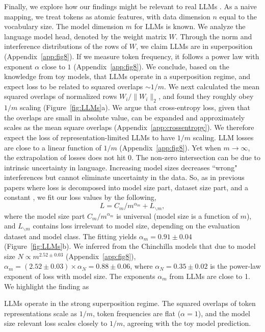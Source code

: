 \documentclass{article}
\begin{document}
Finally, we explore how our findings might be relevant to real LLMs \cite{zhang2022opt,radford2019language,qwen2.5,biderman2023pythia}. As a naive mapping, we treat tokens as atomic features, with data dimension $n$ equal to the vocabulary size. The model dimension $m$ for LLMs is known. We analyze the language model head, denoted by the weight matrix $W$. Through the norm and interference distributions of the rows of $W$, we claim LLMs are in superposition (Appendix~\ref{app:fig8}). If we measure token frequency, it follows a power law with exponent $\alpha$ close to $1$ (Appendix~\ref{app:fig8}). We conclude, based on the knowledge from toy models, that LLMs operate in a superposition regime, and expect loss to be related to squared overlaps $\sim 1/m$. We next calculated the mean squared overlaps of normalized rows $W_i/\| W_i\|_2$, and found they roughly obey $1/m$ scaling (Figure~\ref{fig:LLMs}a). We argue that cross-entropy loss, given that the overlaps are small in absolute value, can be expanded and approximately scales as the mean square overlaps (Appendix~\ref{app:crossentropy}). We therefore expect the loss of representation-limited LLMs to have $1/m$ scaling. LLM losses are close to a linear function of $1/m$ (Appendix~\ref{app:fig8}). Yet when $m\to \infty$, the extrapolation of losses does not hit $0$. The non-zero intersection can be due to intrinsic uncertainty in language. Increasing model sizes decreases ``wrong" interferences but cannot eliminate uncertainty in the data. So, as in previous papers where loss is decomposed into model size part, dataset size part, and a constant \cite{hoffmann2022chinchilla}, we fit our loss values by the following,
\begin{equation}
    L = C_m / m^{\alpha_m} + L_{\backslash m},
\end{equation}
where the model size part $C_m / m^{\alpha_m}$ is universal (model size is a function of $m$), and $L_{\backslash m}$ contains loss irrelevant to model size, depending on the evaluation dataset and model class. The fitting yields $\alpha_m = 0.91 \pm 0.04$ (Figure~\ref{fig:LLMs}b). We inferred from the Chinchilla models \cite{hoffmann2022chinchilla} that due to model size $N\propto m^{2.52\pm0.03}$ (Appendix~\ref{app:fig8}), $\alpha_m = (2.52\pm0.03)\times \alpha_N = 0.88 \pm 0.06$, where $\alpha_N = 0.35\pm 0.02$ \cite{besiroglu2024chinchilla} is the power-law exponent of loss with model size. The exponents $\alpha_m$ from LLMs are close to 1. We highlight the finding as
\begin{tcolorbox}[colframe=mitred, opacityback=0.9, title=Result 3: Superposition is an important mechanism behind LLM neural scaling laws]
LLMs operate in the strong superposition regime. The squared overlaps of token representations scale as $1/m$, token frequencies are flat ($\alpha = 1$), and the model size relevant loss scales closely to $1/m$, agreeing with the toy model prediction.
\end{tcolorbox}
\end{document}
